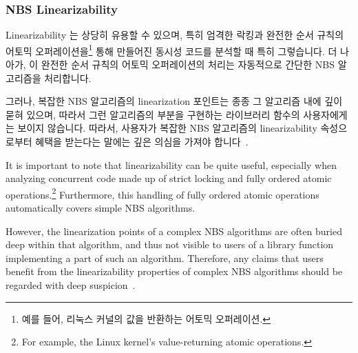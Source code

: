 \iffalse

Nevertheless, there are a few applications where NBS's rather limited
fail-stop-tolerance is useful.
For example, in some network-based or web applications, a fail-stop
event will eventually result in a retransmission, which will restart
any work that was lost due to the fail-stop event.
Systems running such applications can therefore be heavily loaded, even
to the point where the scheduler can no longer provide any reasonable
fairness guarantee.
In constrast, if a thread fail-stops while holding a lock, the application
might need to be restarted.
Nevertheless, NBS is not a panacea even within this restricted area,
due to the possibility of spurious retransmissions due to pure scheduling
delays.
In some cases, it may be more efficient to reduce the load to avoid
queueing delays, which will also improve the scheduler's ability to
provide fair access, reducing or even eliminating the fail-stop events,
thus reducing the number of retry operations, in turn further reducing
the load.

\fi

\subsubsection{NBS Linearizability}
\label{sec:advsync:NBS Linearizability}

Linearizability 는 상당히 유용할 수 있으며, 특히 엄격한 락킹과 완전한 순서
규칙의 어토믹 오퍼레이션을\footnote{
	예를 들어, 리눅스 커널의 값을 반환하는 어토믹 오퍼레이션.}
통해 만들어진 동시성 코드를 분석할 때 특히
그렇습니다.
더 나아가, 이 완전한 순서 규칙의 어토믹 오퍼레이션의 처리는 자동적으로 간단한
NBS 알고리즘을 처리합니다.

그러나, 복잡한 NBS 알고리즘의 linearization 포인트는 종종 그 알고리즘 내에 깊이
묻혀 있으며, 따라서 그런 알고리즘의 부분을 구현하는 라이브러리 함수의
사용자에게는 보이지 않습니다.
따라서, 사용자가 복잡한 NBS 알고리즘의 linearizability 속성으로부터 혜택을
받는다는 말에는 깊은 의심을 가져야 합니다~\cite{AndreasHaas2012FIFOisnt}.

\iffalse

It is important to note that linearizability can be quite useful,
especially when analyzing concurrent code made up of strict locking
and fully ordered atomic operations.\footnote{
	For example, the Linux kernel's value-returning atomic operations.}
Furthermore, this handling of fully ordered atomic operations
automatically covers simple NBS algorithms.

However, the linearization points of a complex NBS algorithms are often
buried deep within that algorithm, and thus not visible to users of
a library function implementing a part of such an algorithm.
Therefore, any claims that users benefit from the linearizability properties
of complex NBS algorithms should be regarded with deep
suspicion~\cite{AndreasHaas2012FIFOisnt}.


